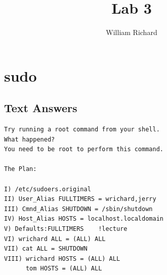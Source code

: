 \documentclass[a4paper,10pt]{article}
\title{Lab 3}
\author{William Richard}
\begin{document}
\maketitle

\section{sudo}
\subsection{Text Answers}
\begin{verbatim}
Try running a root command from your shell.
What happened? 
You need to be root to perform this command.

The Plan:

I) /etc/sudoers.original
II) User_Alias FULLTIMERS = wrichard,jerry
III) Cmnd_Alias SHUTDOWN = /sbin/shutdown
IV) Host_Alias HOSTS = localhost.localdomain
V) Defaults:FULLTIMERS    !lecture
VI) wrichard ALL = (ALL) ALL
VII) cat ALL = SHUTDOWN
VIII) wrichard HOSTS = (ALL) ALL
      tom HOSTS = (ALL) ALL
\end{verbatim}
\end{document}
